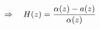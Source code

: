 \documentclass[preview]{standalone}
\begin{document}
\begin{align*}
\special{dvisvgm:raw <g id='unique000'>}\Rightarrow\quad H(z)=\frac{\alpha(z)-a(z)}{\alpha(z)}\special{dvisvgm:raw </g>}
\end{align*}
\end{document}

